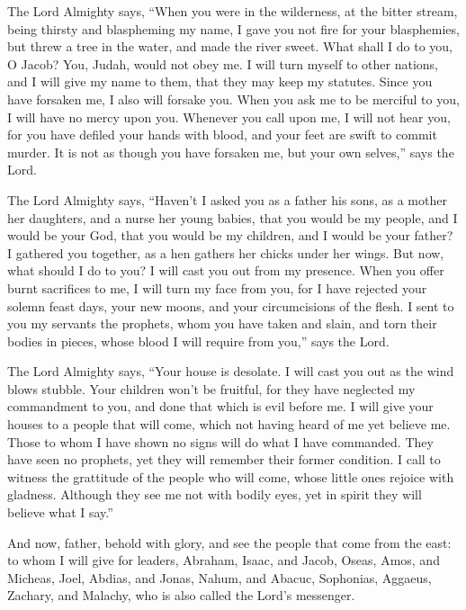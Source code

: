  The Lord Almighty says, ``When you were in the wilderness,
at the bitter stream, being thirsty and blaspheming my name,
 I gave you not fire for your blasphemies, but threw a tree
in the water, and made the river sweet.  What shall I do to
you, O Jacob? You, Judah, would not obey me. I will turn myself to other
nations, and I will give my name to them, that they may keep my
statutes.  Since you have forsaken me, I also will forsake
you. When you ask me to be merciful to you, I will have no mercy upon
you.  Whenever you call upon me, I will not hear you, for
you have defiled your hands with blood, and your feet are swift to
commit murder.  It is not as though you have forsaken me,
but your own selves,'' says the Lord.

 The Lord Almighty says, ``Haven't I asked you as a father
his sons, as a mother her daughters, and a nurse her young babies,
 that you would be my people, and I would be your God, that
you would be my children, and I would be your father?  I
gathered you together, as a hen gathers her chicks under her wings. But
now, what should I do to you? I will cast you out from my presence.
 When you offer burnt sacrifices to me, I will turn my face
from you, for I have rejected your solemn feast days, your new moons,
and your circumcisions of the flesh.  I sent to you my
servants the prophets, whom you have taken and slain, and torn their
bodies in pieces, whose blood I will require from you,'' says the Lord.

 The Lord Almighty says, ``Your house is desolate. I will
cast you out as the wind blows stubble.  Your children
won't be fruitful, for they have neglected my commandment to you, and
done that which is evil before me.  I will give your houses
to a people that will come, which not having heard of me yet believe me.
Those to whom I have shown no signs will do what I have commanded.
 They have seen no prophets, yet they will remember their
former condition.  I call to witness the grattitude of the
people who will come, whose little ones rejoice with gladness. Although
they see me not with bodily eyes, yet in spirit they will believe what I
say.''

 And now, father, behold with glory, and see the people
that come from the east:  to whom I will give for leaders,
Abraham, Isaac, and Jacob, Oseas, Amos, and Micheas, Joel, Abdias, and
Jonas,  Nahum, and Abacuc, Sophonias, Aggaeus, Zachary, and
Malachy, who is also called the Lord's messenger.

